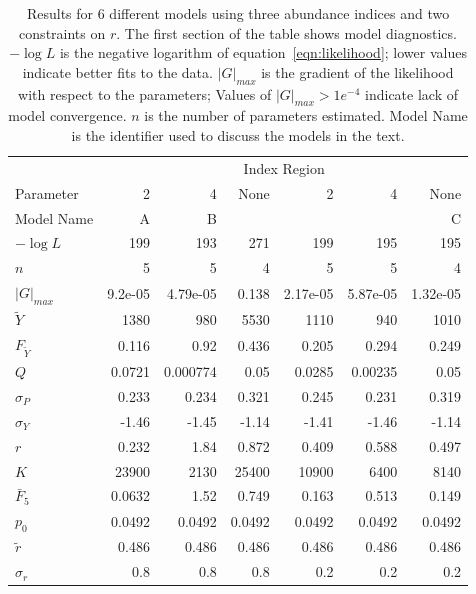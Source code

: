 \documentclass[12pt,letterpaper]{article}
\newcommand\MSY{\widetilde{Y}}
\newcommand\Fmsy{F_{\MSY}}
\begin{document}
\begin{table}
{\small
\caption{Results for 6 different models using three
abundance indices and two constraints on $r$. The first section of the
table shows model diagnostics. $-\log L$ is the negative logarithm of
equation~\ref{eqn:likelihood}; lower values indicate better fits to
the data.
$|G|_{max}$ is the gradient of the likelihood with respect to the
parameters; Values of $|G|_{max}>1e^{-4}$ indicate lack of model
convergence.
$n$ is the number of parameters estimated.
Model Name is the identifier used to discuss the models in the
text.
}
\label{tab:ests1}
\begin{center}
\begin{tabular}{|l|rrr|rrr|}
\hline
 &\multicolumn{6}{c|}{Index Region}\\
\cline{2-7}
Parameter &               2&              4&            None& 
                         2&              4&            None\\
\hline
Model Name & A    & B   &     &     &     & C\\
\hline
\hline
$-\log L$ & 199 & 193 & 271 & 199 & 195 & 195\\
$n$ & 5 & 5 & 4 & 5 & 5 & 4\\
$|G|_{max}$ & 9.2e-05 & 4.79e-05 & 0.138 & 2.17e-05 & 5.87e-05 & 1.32e-05\\
\hline
$\MSY$ & 1380 & 980 & 5530 & 1110 & 940 & 1010\\
$\Fmsy$ & 0.116 & 0.92 & 0.436 & 0.205 & 0.294 & 0.249\\
$Q$ & 0.0721 & 0.000774 & 0.05 & 0.0285 & 0.00235 & 0.05\\
$\sigma_P$ & 0.233 & 0.234 & 0.321 & 0.245 & 0.231 & 0.319\\
$\sigma_Y$ & -1.46 & -1.45 & -1.14 & -1.41 & -1.46 & -1.14\\
\hline
$r$ & 0.232 & 1.84 & 0.872 & 0.409 & 0.588 & 0.497\\
$K$ & 23900 & 2130 & 25400 & 10900 & 6400 & 8140\\
$\bar{F}_5$ & 0.0632 & 1.52  & 0.749 & 0.163 & 0.513 & 0.149\\
\hline
$p_0$ & 0.0492 & 0.0492 & 0.0492 & 0.0492 & 0.0492 & 0.0492\\
$\tilde{r}$ & 0.486 & 0.486 & 0.486 & 0.486 & 0.486 & 0.486\\
$\sigma_r$ & 0.8 & 0.8 & 0.8 & 0.2 & 0.2 & 0.2\\
\hline
\end{tabular}
\end{center}
}
\end{table}
\end{document}
